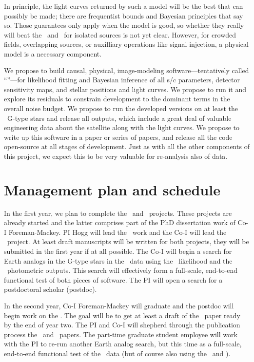 \documentclass[letterpaper,12pt,preprint]{hack_aastex}
\begin{document}
In principle, the light curves returned by such a model will be the best that
can possibly be made; there are frequentist bounds and Bayesian principles
that say so.
Those guarantees only apply when the model is good, so whether they really
will beat the \PLM\ and \OWL\ for isolated sources is not yet clear.
However, for crowded fields, overlapping sources, or auxilliary operations
like signal injection, a physical model is a necessary component.

We propose to build causal, physical, image-modeling
software---tentatively called ``\kpsf''---for likelihood fitting and Bayesian
inference of all s/c parameters, detector sensitivity maps, and stellar
positions and light curves.
We propose to run it and explore its residuals to constrain development to
the dominant terms in the overall noise budget.
We propose to run the developed versions on at least the \Kepler\ G-type
stars and release all outputs, which include a great deal of valuable
engineering data about the satellite along with the light curves.
We propose to write up this software in a paper or series of papers,
and release all the code open-source at all stages of development.
Just as with all the other components of this project, we expect this to be
very valuable for re-analysis also of  data.

\section{Management plan and schedule}

In the first year, we plan to complete the \OWL\ and \George\ projects.
These projects are already started and the latter comprises part of the PhD
dissertation work of Co-I Foreman-Mackey.
PI Hogg will lead the \OWL\ work and the Co-I will lead the \George\ project.
At least draft manuscripts will be written for both projects, they will
be submitted in the first year if at all possible.
The Co-I will begin a search for Earth analogs in the G-type stars in the
\Kepler\ data using the \George\ likelihood and the \OWL\ photometric outputs.
This search will effectively form a full-scale, end-to-end functional test of
both pieces of software.
The PI will open a search for a postdoctoral scholar (postdoc).

In the second year, Co-I Foreman-Mackey will graduate and the postdoc will
begin work on the \PLM.
The goal will be to get at least a draft of the \PLM\ paper ready by the end
of year two.
The PI and Co-I will shepherd through the publication process the \OWL\ and
\George\ papers.
The part-time graduate student employee will work with the PI to
re-run another Earth analog search, but this time
as a full-scale, end-to-end functional test of the \PLM\ data (but of course
also using the \OWL\ and \George).
\end{document}
